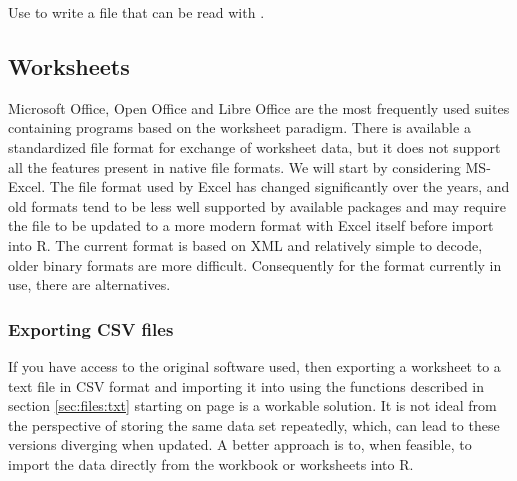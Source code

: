 \documentclass[krantz2]{krantz}\usepackage{knitr}%
\begin{document}
\begin{advplayground}
Use  to write a file that can be read with .
\end{advplayground}

\subsection{Worksheets}\label{sec:files:worksheets}

Microsoft Office, Open Office and Libre Office are the most frequently used suites containing programs based on the worksheet paradigm. There is available a standardized file format for exchange of worksheet data, but it does not support all the features present in native file formats. We will start by considering MS-Excel. The file format used by Excel has changed significantly over the years, and old formats tend to be less well supported by available \Rlang packages and may require the file to be updated to a more modern format with Excel itself before import into R. The current format is based on XML and relatively simple to decode, older binary formats are more difficult. Consequently for the format currently in use, there are alternatives.

\subsubsection{Exporting CSV files}

If you have access to the original software used, then exporting a worksheet to a text file in CSV format and importing it into \Rlang using the functions described in section \ref{sec:files:txt} starting on page \pageref{sec:files:txt} is a workable solution. It is not ideal from the perspective of storing the same data set repeatedly, which, can lead to these versions diverging when updated. A better approach is to, when feasible, to import the data directly from the workbook or worksheets into R.

\subsubsection['readxl']{}\label{sec:files:excel}
\end{document}
